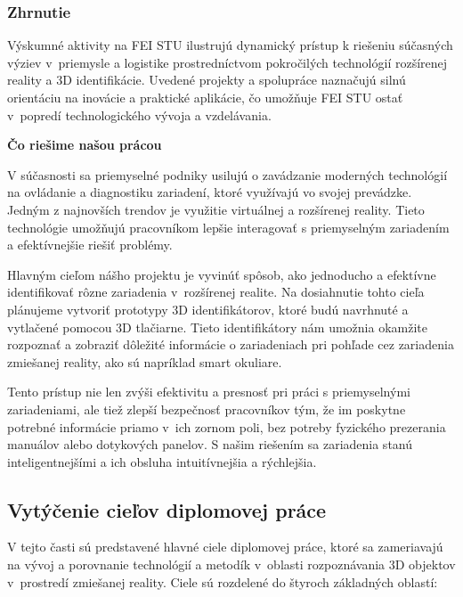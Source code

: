 
\subsubsection{Zhrnutie}

Výskumné aktivity na FEI STU ilustrujú dynamický prístup k riešeniu súčasných výziev v~priemysle a logistike prostredníctvom pokročilých technológií rozšírenej reality a 3D identifikácie. Uvedené projekty a spolupráce naznačujú silnú orientáciu na inovácie a praktické aplikácie, čo umožňuje FEI STU ostať v~popredí technologického vývoja a vzdelávania.

{\large\textbf{Čo riešime našou prácou}}

V súčasnosti sa priemyselné podniky usilujú o zavádzanie moderných technológií na ovládanie a diagnostiku zariadení, ktoré využívajú vo svojej prevádzke. Jedným z najnovších trendov je využitie virtuálnej a rozšírenej reality. Tieto technológie umožňujú pracovníkom lepšie interagovať s priemyselným zariadením a efektívnejšie riešiť problémy.

Hlavným cieľom nášho projektu je vyvinúť spôsob, ako jednoducho a efektívne identifikovať rôzne zariadenia v~rozšírenej realite. Na dosiahnutie tohto cieľa plánujeme vytvoriť prototypy 3D identifikátorov, ktoré budú navrhnuté a vytlačené pomocou 3D tlačiarne. Tieto identifikátory nám umožnia okamžite rozpoznať a zobraziť dôležité informácie o zariadeniach pri pohľade cez zariadenia zmiešanej reality, ako sú napríklad smart okuliare.

Tento prístup nie len zvýši efektivitu a presnosť pri práci s priemyselnými zariadeniami, ale tiež zlepší bezpečnosť pracovníkov tým, že im poskytne potrebné informácie priamo v~ich zornom poli, bez potreby fyzického prezerania manuálov alebo dotykových panelov. S našim riešením sa zariadenia stanú inteligentnejšími a ich obsluha intuitívnejšia a rýchlejšia.


\subsection{Vytýčenie cieľov diplomovej práce}
V tejto časti sú predstavené hlavné ciele diplomovej práce, ktoré sa zameriavajú na vývoj a porovnanie technológií a metodík v~oblasti rozpoznávania 3D objektov v~prostredí zmiešanej reality. Ciele sú rozdelené do štyroch základných oblastí:

